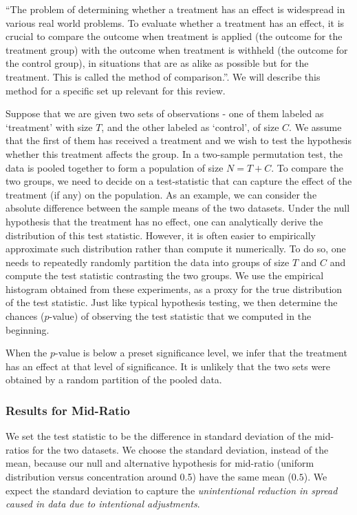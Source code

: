 \documentclass{article}
\begin{document}
``The problem of determining whether a treatment has an effect is widespread in various real world problems. 
To evaluate whether a treatment has an effect, it is crucial to compare the outcome when treatment is applied (the outcome for the treatment group) with the outcome when treatment is withheld (the outcome for the control group), in situations that are as alike as possible but for the treatment. This is called the method of comparison.''\cite{philip}. 
We will describe this method for a specific set up relevant for this review.

Suppose that we are given two sets of observations - one of them labeled as `treatment' with size $T$, and the other labeled as `control', of size $C$. 
We assume that the first of them has received a treatment and we wish to test the hypothesis whether this treatment affects the group. 
In a two-sample permutation test, the data is pooled together
to form a population of size \(N = T+C\).
To compare the two groups, we need to decide on a test-statistic that can capture the effect of the treatment (if any) on the population. 
As an example, we can consider the absolute difference between the sample means of the two datasets.
Under the null hypothesis that the treatment has no effect, one can analytically derive the distribution of this test statistic. 
However, it is often easier to empirically approximate such distribution rather than compute it numerically. 
To do so, one needs to repeatedly randomly  partition the data into groups of size \(T\) and \(C\) and compute the test statistic contrasting the two groups. 
We use the empirical histogram obtained from these experiments, as a proxy for the true distribution of the test statistic. 
Just like typical hypothesis testing, we then determine the chances ($p$-value) of observing the test statistic that we computed in the beginning.

When the $p$-value is below a preset significance level, we infer that the treatment has an effect at that level of significance. It is unlikely that the two sets  were obtained by a random partition of the pooled data.


    \subsubsection{Results for
Mid-Ratio}\label{permutation-tests-for-mid-ratio}

We set the test statistic to be the difference in
standard deviation of the mid-ratios for the two datasets. 
We choose the standard deviation, instead of the mean, because our null and alternative hypothesis for mid-ratio (uniform distribution versus concentration around 0.5) have the same mean ($0.5$). 
We expect the standard deviation to capture
the \textit{unintentional reduction in spread caused in data due to
intentional adjustments}.
\end{document}
